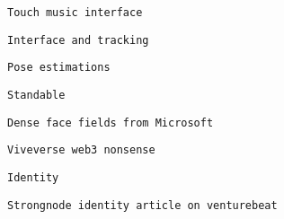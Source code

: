        
       
        \protect\hypertarget{ID_1941149748}{}{}

\begin{verbatim}
Touch music interface
\end{verbatim}
       

       
       
        \protect\hypertarget{ID_1864466123}{}{}

\begin{verbatim}
Interface and tracking
\end{verbatim}

         
         
          \protect\hypertarget{ID_1112826190}{}{}

\begin{verbatim}
Pose estimations
\end{verbatim}

           
           
            \protect\hypertarget{ID_500860965}{}{}

\begin{verbatim}
Standable
\end{verbatim}
           
         

         
         
          \protect\hypertarget{ID_1149310948}{}{}

\begin{verbatim}
Dense face fields from Microsoft
\end{verbatim}
         
       

       
       
        \protect\hypertarget{ID_1821629589}{}{}

\begin{verbatim}
Viveverse web3 nonsense
\end{verbatim}
       
     

     
     
      \protect\hypertarget{ID_941226008}{}{}

\begin{verbatim}
Identity
\end{verbatim}

       
       
        \protect\hypertarget{ID_1010307996}{}{}

\begin{verbatim}
Strongnode identity article on venturebeat
\end{verbatim}
       
